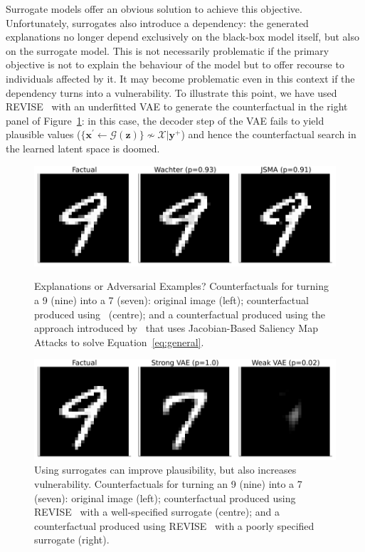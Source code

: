 \documentclass{article}
\begin{document}
Surrogate models offer an obvious solution to achieve this objective. Unfortunately, surrogates also introduce a dependency: the generated explanations no longer depend exclusively on the black-box model itself, but also on the surrogate model. This is not necessarily problematic if the primary objective is not to explain the behaviour of the model but to offer recourse to individuals affected by it. It may become problematic even in this context if the dependency turns into a vulnerability. To illustrate this point, we have used REVISE~\citep{joshi2019realistic} with an underfitted VAE to generate the counterfactual in the right panel of Figure~\ref{fig:vae}: in this case, the decoder step of the VAE fails to yield plausible values ($\{\mathbf{x}^{\prime} \leftarrow \mathcal{G}(\mathbf{z})\} \not\sim \mathcal{X}|\mathbf{y}^+$) and hence the counterfactual search in the learned latent space is doomed.

\begin{figure}
  \centering
  \begin{minipage}[t]{0.45\textwidth}
    \centering
    \includegraphics[width=\textwidth]{../artifacts/results/images/you_may_not_like_it.png}
    \caption{Explanations or Adversarial Examples? Counterfactuals for turning a 9 (nine) into a 7 (seven): original image (left); counterfactual produced using~\citet{wachter2017counterfactual} (centre); and a counterfactual produced using the approach introduced by~\citep{schut2021generating} that uses Jacobian-Based Saliency Map Attacks to solve Equation~\ref{eq:general}.}\label{fig:adv}
  \end{minipage}\hfill
  \begin{minipage}[t]{0.45\textwidth}
    \centering
    \includegraphics[width=\textwidth]{../artifacts/results/images/surrogate_gone_wrong.png}
    \caption{Using surrogates can improve plausibility, but also increases vulnerability. Counterfactuals for turning an 9 (nine) into a 7 (seven): original image (left); counterfactual produced using REVISE~\citep{joshi2019realistic} with a well-specified surrogate (centre); and a counterfactual produced using REVISE~\citep{joshi2019realistic} with a poorly specified surrogate (right).}\label{fig:vae}
  \end{minipage}
\end{figure}
\end{document}
